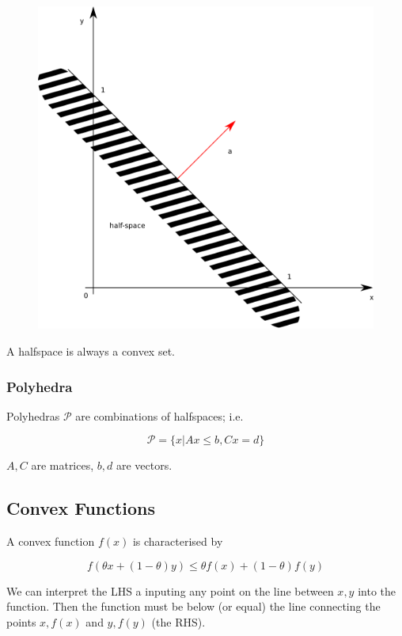 \begin{figure}[H]
\includegraphics[scale=0.7]{images/convex_opt_01.png}
\end{figure}

A halfspace is always a convex set.

\subsubsection{Polyhedra}

Polyhedras $\mathcal{P}$ are combinations of halfspaces; i.e.

\[
\mathcal{P} = \{ x | A x \leq b, Cx = d  \}
\]

$A, C$ are matrices, $b, d$ are vectors.

\subsection{Convex Functions}

A convex function $f(x)$ is characterised by

\[
f(\theta x + (1-\theta)y) \leq \theta f(x) + (1-\theta)f(y)
\]

We can interpret the LHS a inputing any point on the line between
$x, y$ into the function. Then the function must be below (or equal) the line connecting the points $x, f(x)$ and $y, f(y)$ (the RHS).

